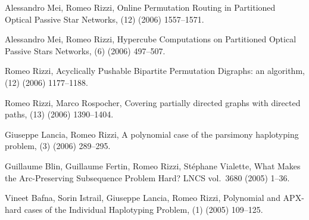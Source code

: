 \begin{etaremune}
  \item {\sc Alessandro Mei, Romeo Rizzi},
   \newblock  Online Permutation Routing in
              Partitioned Optical Passive Star Networks,
   (12) (2006) 1557--1571.

  \item {\sc Alessandro Mei, Romeo Rizzi},
   \newblock  Hypercube Computations on Partitioned Optical
              Passive Stars Networks,
   (6) (2006) 497--507.

  \item {\sc Romeo Rizzi},
   \newblock  Acyclically Pushable Bipartite Permutation Digraphs: an algorithm,
   (12) (2006) 1177--1188.

  \item {\sc Romeo Rizzi, Marco Rospocher},
   \newblock  Covering partially directed graphs with directed paths,
   (13) (2006) 1390--1404.

  \item {\sc Giuseppe Lancia, Romeo Rizzi},
   \newblock  A polynomial case of the parsimony haplotyping problem,
   (3) (2006) 289--295.

  \item {\sc Guillaume Blin, Guillaume Fertin, Romeo Rizzi,
                  St\'ephane Vialette},
   \newblock What Makes the Arc-Preserving Subsequence Problem Hard?
   \newblock  LNCS vol.~3680 (2005) 1--36.

  \item {\sc Vineet Bafna, Sorin Istrail, Giuseppe Lancia, Romeo Rizzi},
   \newblock  Polynomial and APX-hard cases of the Individual Haplotyping Problem,
   (1) (2005) 109--125.


\end{etaremune}
